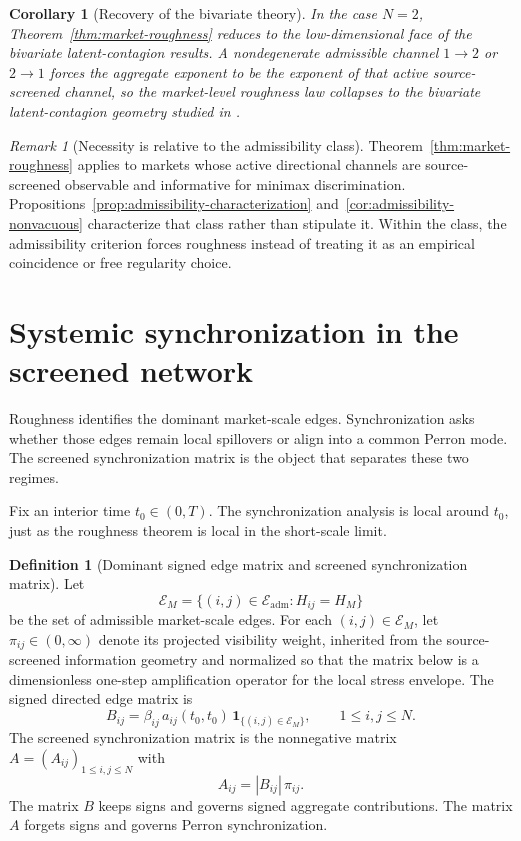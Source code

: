 \documentclass[11pt,a4paper]{amsart}
\theoremstyle{plain}
\newtheorem{corollary}[theorem]{Corollary}
\theoremstyle{definition}
\newtheorem{definition}[theorem]{Definition}
\theoremstyle{remark}
\newtheorem{remark}[theorem]{Remark}
\newcommand{\one}{\mathbf{1}}
\newcommand{\cE}{\mathcal{E}}
\begin{document}
\begin{corollary}[Recovery of the bivariate theory]\label{cor:bivariate-face}
In the case \(N=2\), Theorem~\ref{thm:market-roughness} reduces to the low-dimensional face of the
bivariate latent-contagion results.  A nondegenerate admissible channel \(1\to2\) or
\(2\to1\) forces the aggregate exponent to be the exponent of that active source-screened channel,
so the market-level roughness law collapses to the bivariate latent-contagion geometry studied in
\cite{vidal2026latent,vidal2026dynamic,vidal2026econometric}.
\end{corollary}

\begin{remark}[Necessity is relative to the admissibility class]
Theorem~\ref{thm:market-roughness} applies to markets whose active directional channels are
source-screened observable and informative for minimax discrimination.
Propositions~\ref{prop:admissibility-characterization} and~\ref{cor:admissibility-nonvacuous}
characterize that class rather than stipulate it.  Within the class, the admissibility criterion
forces roughness instead of treating it as an empirical coincidence or free regularity choice.
\end{remark}

\section{Systemic synchronization in the screened network}\label{sec:sync}

Roughness identifies the dominant market-scale edges.  Synchronization asks whether those edges
remain local spillovers or align into a common Perron mode.  The screened synchronization matrix is
the object that separates these two regimes.

Fix an interior time \(t_0\in(0,T)\).  The synchronization analysis is local around \(t_0\), just as
the roughness theorem is local in the short-scale limit.

\begin{definition}[Dominant signed edge matrix and screened synchronization matrix]
Let
\[
        \cE_M
        =
        \{(i,j)\in\cE_{\mathrm{adm}}: H_{ij}=H_M\}
\]
be the set of admissible market-scale edges.  For each \((i,j)\in\cE_M\), let
\(\pi_{ij}\in(0,\infty)\) denote its projected visibility weight, inherited from the
source-screened information geometry and normalized so that the matrix below is a dimensionless
one-step amplification operator for the local stress envelope.  The signed directed edge matrix is
\[
        B_{ij}
        =
        \beta_{ij}\,a_{ij}(t_0,t_0)\,\one_{\{(i,j)\in\cE_M\}},
        \qquad 1\le i,j\le N.
\]
The screened synchronization matrix is the nonnegative matrix \(A=(A_{ij})_{1\le i,j\le N}\) with
\[
        A_{ij}
        =
        |B_{ij}|\,\pi_{ij}.
\]
The matrix \(B\) keeps signs and governs signed aggregate contributions.  The matrix \(A\) forgets
signs and governs Perron synchronization.
\end{definition}
\end{document}
